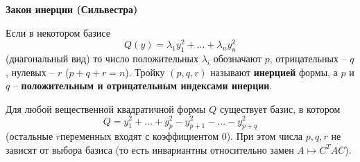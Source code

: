 \documentclass[14pt]{extreport}
\begin{document}
    \begin{thbox}
        \textbf{Закон инерции (Сильвестра)}
        \begin{defbox}
            Если в некотором базисе
            \[
            Q(y) = \lambda_1y_1^2 + ... + \lambda_ny_n^2
            \]
            (диагональный вид) то число положительных $\lambda_i$ обозначают $p$, отрицательных – $q$, нулевых – $r$ ($p+q+r=n$). Тройку $(p,q,r)$ называют \textbf{инерцией} формы, а $p$ и $q$ – \textbf{положительным и отрицательным индексами инерции}.
        \end{defbox}
        Для любой вещественной квадратичной формы $Q$ существует базис, в котором
        \[
        Q = y_1^2 + ... + y_p^2 - y_{p+1}^2 - ... - y_{p+q}^2
        \]
        (остальные $r$переменных входят с коэффициентом $0$). При этом числа $p,q,r$ не зависят от выбора базиса (то есть инвариантны относительно замен $A \mapsto C^TAC$).
    \end{thbox}
\end{document}
